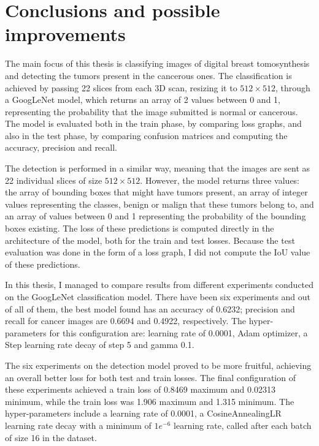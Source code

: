 \chapter{Conclusions and possible improvements}
\label{chap:ch6}

The main focus of this thesis is classifying images of digital breast tomosynthesis and detecting the tumors present in the cancerous ones. The classification is achieved by passing 22 slices from each 3D scan, resizing it to $512\times512$, through a GoogLeNet model, which returns an array of 2 values between 0 and 1, representing the probability that the image submitted is normal or cancerous. The model is evaluated both in the train phase, by comparing loss graphs, and also in the test phase, by comparing confusion matrices and computing the accuracy, precision and recall.

The detection is performed in a similar way, meaning that the images are sent as 22 individual slices of size $512\times512$. However, the model returns three values: the array of bounding boxes that might have tumors present, an array of integer values representing the classes, benign or malign that these tumors belong to, and an array of values between 0 and 1 representing the probability of the bounding boxes existing. The loss of these predictions is computed directly in the architecture of the model, both for the train and test losses. Because the test evaluation was done in the form of a loss graph, I did not compute the IoU value of these predictions.

In this thesis, I managed to compare results from different experiments conducted on the GoogLeNet classification model. There have been six experiments and out of all of them, the best model found has an accuracy of 0.6232; precision and recall for cancer images are 0.6694 and 0.4922, respectively. The hyper-parameters for this configuration are: learning rate of 0.0001, Adam optimizer, a Step learning rate decay of step 5 and gamma 0.1.

The six experiments on the detection model proved to be more fruitful, achieving an overall better loss for both test and train losses. The final configuration of these experiments achieved a train loss of 0.8469 maximum and 0.02313 minimum, while the train loss was 1.906 maximum and 1.315 minimum. The hyper-parameters include a learning rate of 0.0001, a CosineAnnealingLR learning rate decay with a minimum of $1e^{-6}$ learning rate, called after each batch of size 16 in the dataset.

